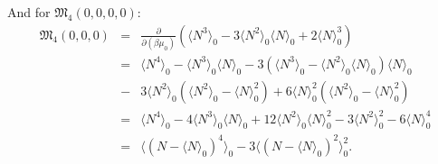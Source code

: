 And for $\mathfrak{M}_4(0,0,0,0):$
\begin{eqnarray}
	\mathfrak{M}_4(0,0,0) &=& \frac{\partial}{\partial(\beta\mu_0)}
	\left(\langle N^3 \rangle_0 - 3\langle N^2 \rangle_0\langle N \rangle_0 +2 \langle N \rangle_0^3\right) 
	\nonumber\\
	&=& \langle N^4 \rangle_0 - \langle N^3 \rangle_0\langle N \rangle_0 
	- 3\left(\langle N^3 \rangle_0 - \langle N^2 \rangle_0\langle N \rangle_0\right)\langle N \rangle_0
	\nonumber\\
	&-&3\langle N^2 \rangle_0 \left(\langle N^2 \rangle_0 - \langle N \rangle_0^2 \right)
	+ 6\langle N \rangle_0^2 \left(\langle N^2 \rangle_0 - \langle N \rangle_0^2\right)
	\nonumber\\
	&=& \langle N^4 \rangle_0 
	- 4\langle N^3 \rangle_0\langle N \rangle_0 
	+ 12\langle N^2 \rangle_0\langle N \rangle_0^2 
	- 3\langle N^2 \rangle_0^2 
	- 6\langle N \rangle_0^4
	\nonumber\\
	&=& \langle (N - \langle N \rangle_0)^4 \rangle_0 - 3 \langle (N - \langle N \rangle_0)^2 \rangle_0^2.
\end{eqnarray}
